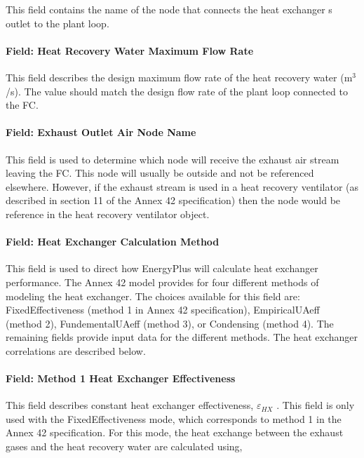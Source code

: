 This field contains the name of the node that connects the heat exchanger s outlet to the plant loop.

\paragraph{Field: Heat Recovery Water Maximum Flow Rate}\label{field-heat-recovery-water-maximum-flow-rate}

This field describes the design maximum flow rate of the heat recovery water (m\(^{3}\)/s). The value should match the design flow rate of the plant loop connected to the FC.

\paragraph{Field: Exhaust Outlet Air Node Name}\label{field-exhaust-outlet-air-node-name}

This field is used to determine which node will receive the exhaust air stream leaving the FC. This node will usually be outside and not be referenced elsewhere. However, if the exhaust stream is used in a heat recovery ventilator (as described in section 11 of the Annex 42 specification) then the node would be reference in the heat recovery ventilator object.

\paragraph{Field: Heat Exchanger Calculation Method}\label{field-heat-exchanger-calculation-method}

This field is used to direct how EnergyPlus will calculate heat exchanger performance. The Annex 42 model provides for four different methods of modeling the heat exchanger. The choices available for this field are: FixedEffectiveness (method 1 in Annex 42 specification), EmpiricalUAeff (method 2), FundementalUAeff (method 3), or Condensing (method 4). The remaining fields provide input data for the different methods. The heat exchanger correlations are described below.

\paragraph{Field: Method 1 Heat Exchanger Effectiveness}\label{field-method-1-heat-exchanger-effectiveness}

This field describes constant heat exchanger effectiveness, \({\varepsilon_{HX}}\) . This field is only used with the FixedEffectiveness mode, which corresponds to method 1 in the Annex 42 specification. For this mode, the heat exchange between the exhaust gases and the heat recovery water are calculated using,

